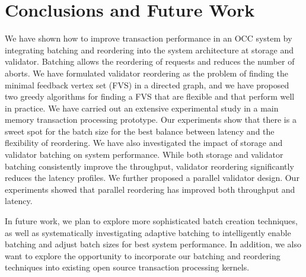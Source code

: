 \section{Conclusions and Future Work}\label{sec:conclusion}
We have shown how to improve transaction performance in an OCC system by integrating batching and reordering into the system architecture at storage and validator. Batching allows the reordering of requests and reduces the number of aborts. We have formulated validator reordering as the problem of finding the minimal feedback vertex set (FVS) in a directed graph, and we have proposed two greedy algorithms for finding a FVS that are flexible and that perform well in practice. We have carried out an extensive experimental study in a main memory transaction processing prototype. Our experiments show that there is a sweet spot for the batch size for the best balance between latency and the flexibility of reordering. We have also investigated the impact of storage and validator batching on system performance. While both storage and validator batching consistently improve the throughput, validator reordering significantly reduces the latency profiles. We further proposed a parallel validator design. Our experiments showed that parallel reordering has improved both throughput and latency.


In future work, we plan to explore more sophisticated batch creation techniques, as well as systematically investigating adaptive batching to intelligently enable batching and adjust batch sizes for best system performance. In addition, we also want to explore
the opportunity to incorporate our batching and reordering techniques into existing open source transaction processing kernels.
